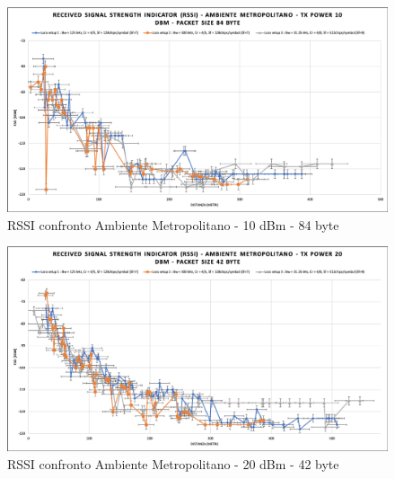 \documentclass[12pt,a4paper,openright,twoside]{report}
\begin{document}
\begin{figure}[h!]                      
\begin{center} 
\includegraphics[width=\textwidth]{RSSI_confronto_AM-10dBm-84byte.png}
\caption[RSSI confronto Ambiente Metropolitano - 10 dBm - 84 byte]{RSSI confronto Ambiente Metropolitano - 10 dBm - 84 byte}\label{fig:prima}
\end{center}
\end{figure}

\begin{figure}[h]                      
\begin{center} 
\includegraphics[width=\textwidth]{RSSI_confronto_AM-20dBm-42byte.png}
\caption[RSSI confronto Ambiente Metropolitano - 20 dBm - 42 byte]{RSSI confronto Ambiente Metropolitano - 20 dBm - 42 byte}\label{fig:prima}
\end{center}
\end{figure}
\end{document}
